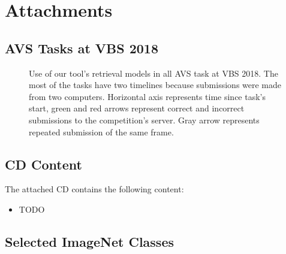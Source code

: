 \chapter{Attachments}

\section{AVS Tasks at VBS 2018}\label{att:vbs_tasks_timeline_avs}

\begin{figure}[h]
	\centering
	
	
	\caption[Use of tool's retrieval models in AVS tasks]{Use of our tool's retrieval models in all AVS task at VBS 2018. The most of the tasks have two timelines because submissions were made from two computers. Horizontal axis represents time since task's start, green and red arrows represent correct and incorrect submissions to the competition's server. Gray arrow represents repeated submission of the same frame.}
	\label{fig:vbs_tasks_timeline_avs}
\end{figure}

\section{CD Content}\label{att:cd}
The attached CD contains the following content:
\begin{itemize}
	\item TODO
\end{itemize}

\clearpage
\section{Selected ImageNet Classes}\label{att:classes}
\noindent\begin{multicols}{9}
{\scriptsize }
\end{multicols}